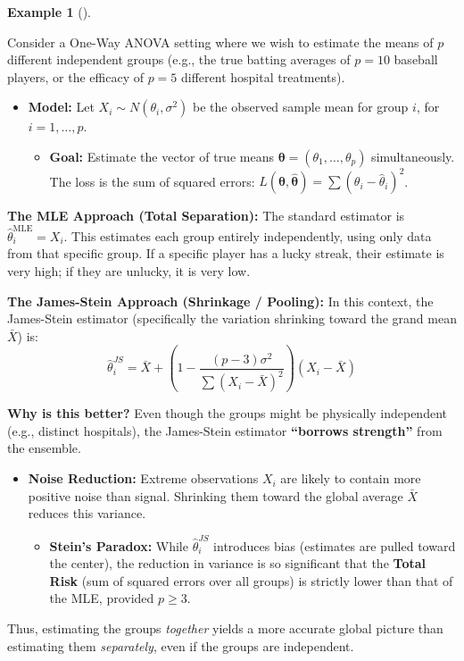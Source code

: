 \documentclass[
  letterpaper,
  DIV=11,
  numbers=noendperiod]{scrreprt}
\providecommand{\tightlist}{%
  \setlength{\itemsep}{0pt}\setlength{\parskip}{0pt}}
\renewcommand{\[}{\begin{equation}}
\renewcommand{\]}{\end{equation}}
\theoremstyle{definition}
\theoremstyle{plain}
\theoremstyle{plain}
\theoremstyle{plain}
\theoremstyle{definition}
\newtheorem{example}{Example}[chapter]
\theoremstyle{plain}
\theoremstyle{remark}
\begin{document}
\begin{example}[]\protect\hypertarget{exm-anova-js}{}\label{exm-anova-js}

Consider a One-Way ANOVA setting where we wish to estimate the means of
\(p\) different independent groups (e.g., the true batting averages of
\(p=10\) baseball players, or the efficacy of \(p=5\) different hospital
treatments).

\begin{itemize}
\tightlist
\item
  \textbf{Model:} Let \(X_i \sim N(\theta_i, \sigma^2)\) be the observed
  sample mean for group \(i\), for \(i = 1, \dots, p\).

  \begin{itemize}
  \tightlist
  \item
    \textbf{Goal:} Estimate the vector of true means
    \(\boldsymbol{\theta} = (\theta_1, \dots, \theta_p)\)
    simultaneously. The loss is the sum of squared errors:
    \(L(\boldsymbol{\theta}, \hat{\boldsymbol{\theta}}) = \sum (\theta_i - \hat{\theta}_i)^2\).
  \end{itemize}
\end{itemize}

\textbf{The MLE Approach (Total Separation):} The standard estimator is
\(\hat{\theta}_i^{\text{MLE}} = X_i\). This estimates each group
entirely independently, using only data from that specific group. If a
specific player has a lucky streak, their estimate is very high; if they
are unlucky, it is very low.

\textbf{The James-Stein Approach (Shrinkage / Pooling):} In this
context, the James-Stein estimator (specifically the variation shrinking
toward the grand mean \(\bar{X}\)) is: \[
\hat{\theta}_i^{JS} = \bar{X} + \left( 1 - \frac{(p-3)\sigma^2}{\sum (X_i - \bar{X})^2} \right) (X_i - \bar{X})
\]

\textbf{Why is this better?} Even though the groups might be physically
independent (e.g., distinct hospitals), the James-Stein estimator
\textbf{``borrows strength''} from the ensemble.

\begin{itemize}
\tightlist
\item
  \textbf{Noise Reduction:} Extreme observations \(X_i\) are likely to
  contain more positive noise than signal. Shrinking them toward the
  global average \(\bar{X}\) reduces this variance.

  \begin{itemize}
  \tightlist
  \item
    \textbf{Stein's Paradox:} While \(\hat{\theta}_i^{JS}\) introduces
    bias (estimates are pulled toward the center), the reduction in
    variance is so significant that the \textbf{Total Risk} (sum of
    squared errors over all groups) is strictly lower than that of the
    MLE, provided \(p \ge 3\).
  \end{itemize}
\end{itemize}

Thus, estimating the groups \emph{together} yields a more accurate
global picture than estimating them \emph{separately}, even if the
groups are independent.

\end{example}
\end{document}
